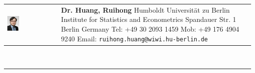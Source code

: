 \documentclass[a4paper,10pt]{article}
\begin{document}
\newcommand{\HU}[0]{Humboldt Universit\"at zu Berlin}
\fancyhf{}
\renewcommand{\headrulewidth}{0pt}
\renewcommand{\footrulewidth}{1pt}
\renewcommand\footrule{\begin{minipage}{1\textwidth}
\hrule width \hsize height 2pt \kern 1mm \hrule width \hsize   
\end{minipage}\par}
\pagestyle{fancy}
\begin{tabular}[h]{p{}p{}}
  \vfill\hspace{-10pt}\includegraphics[width=0.25\textwidth]{bew/ruihong_2013.jpg} &\vspace{1pt}\large{\textbf{Dr. Huang, Ruihong}\newline
  \vspace{-8pt} \newline
Humboldt Universit\"at zu Berlin \newline 
Institute for Statistics and Econometrics  ­\newline
Spandauer Str. 1  \newline
10178 Berlin\newline
Germany \newline
Tel: +49 30 2093 1459 \newline
Mob: +49 176 4904 9240 \newline
Email: \verb|ruihong.huang@wiwi.hu-berlin.de| } \\
\end{tabular}\\
\rule[5pt]{1\textwidth}{1pt}\par
\setlength{\tabcolsep}{10pt}
\setlength{\extrarowheight}{6pt}
\end{document}
